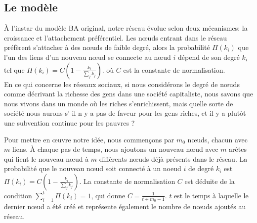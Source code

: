    \subsection{Le modèle}
À l'instar du modèle BA original, notre réseau évolue selon deux mécanismes: la croissance et l'attachement préférentiel. Les nœuds entrant dans le réseau préfèrent s'attacher à des nœuds de faible degré, alors la probabilité $\Pi(k_i)$ que l'un des liens d'un nouveau nœud se connecte au nœud $i$ dépend de son degré $k_i$ tel que $\Pi(k_i)=C(1-\frac{k_i}{\sum_jk_j})$. où $C$ est la constante de normalisation.\\
En ce qui concerne les réseaux sociaux, si nous considérons le degré de nœuds comme décrivant la richesse des gens dans une société capitaliste, nous savons que nous vivons dans un monde où les riches s'enrichissent, mais quelle sorte de société nous aurons s' il n y a pas de faveur pour les gens riches, et il y a plutôt une subvention continue pour les pauvres ?
   
   Pour mettre en œuvre notre idée, nous commençons par $m_0$ nœuds, chacun avec $m$ liens. À chaque pas de temps, nous ajoutons un nouveau nœud avec $m$ arêtes qui lient le nouveau nœud à $m$ différents nœuds déjà présents dans le réseau. La probabilité que le nouveau nœud soit connecté à un noeud $i$ de degré $k_i$ est $\Pi(k_i)=C(1-\frac{k_i}{\sum_jk_j})$. La constante de normalisation $C$ est déduite de la condition $\sum_{i=1}^{t}\Pi(k_i)=1$, qui donne $C=\frac{1}{t+m_0-1}$. $t$ est le temps à laquelle le dernier nœud a été créé et représente également le nombre de nœuds ajoutés au réseau.
   
